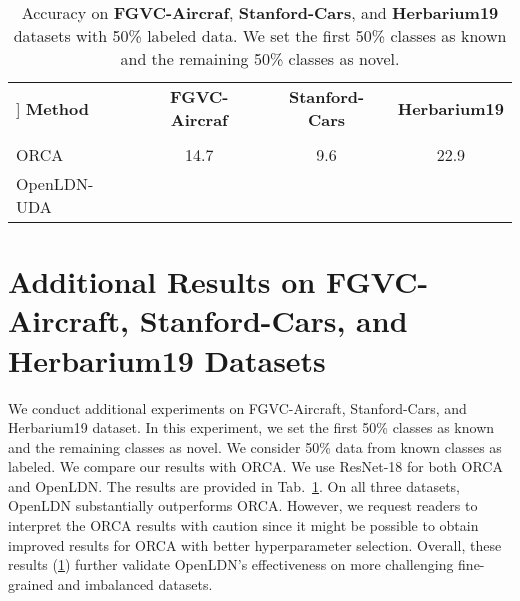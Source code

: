 \documentclass[runningheads]{eccv2022submission}
\begin{document}
\begin{table}[h]
\begin{center}\setlength{\tabcolsep}{2pt}
\small
\begin{tabular}{lccc}
\hline

\hline

\hline\-3mm]
\textbf{Method}  & \textbf{FGVC-Aircraf} & \textbf{Stanford-Cars} & \textbf{Herbarium19}\\
 [-3mm]
\\
 \hline

\hline

\hline
ORCA\cite{cao2022openworld} & 14.7 & 9.6 & 22.9 \\
\rowcolor[gray]{.95} {OpenLDN-UDA} & {\tiny{\textcolor{teal}{}}} & {\tiny{\textcolor{teal}{}}} & {\tiny{\textcolor{teal}{}}}\\\hline 

\hline

\hline
\end{tabular}
\end{center}
\caption{Accuracy on \textbf{FGVC-Aircraf}, \textbf{Stanford-Cars}, and \textbf{Herbarium19} datasets with 50\% labeled data. We set the first 50\% classes as known and the remaining 50\% classes as novel.}
\label{tab:three_dataset}
\vspace{-10mm}
\end{table}



\section{Additional Results on FGVC-Aircraft, Stanford-Cars, and Herbarium19 Datasets}
\label{sec:three_dataset}

We conduct additional experiments on FGVC-Aircraft\cite{maji13fine-grained}, Stanford-Cars\cite{KrauseStarkDengFei-Fei_3DRR2013}, and Herbarium19 \cite{tan2019herbarium} dataset. In this experiment, we set the first 50\% classes as known and the remaining classes as novel. We consider 50\% data from known classes as labeled. We compare our results with ORCA. We use ResNet-18 for both ORCA and OpenLDN. The results are provided in Tab.~\ref{tab:three_dataset}. On all three datasets, OpenLDN substantially outperforms ORCA. However, we request readers to interpret the ORCA results with caution since it might be possible to obtain improved results for ORCA with better hyperparameter selection. Overall, these results (\ref{tab:three_dataset}) further validate OpenLDN’s effectiveness on more challenging fine-grained and imbalanced datasets.
\end{document}
